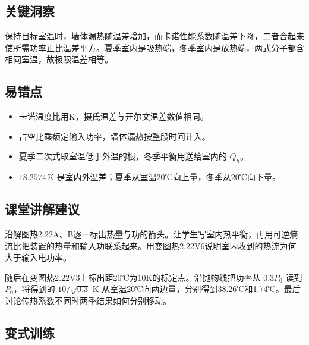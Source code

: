 \documentclass[UTF8,fontset=fandol,a4paper,11pt]{ctexart}
\begin{document}
\subsection*{关键洞察}

保持目标室温时，墙体漏热随温差增加，而卡诺性能系数随温差下降，二者合起来使所需功率正比温差平方。夏季室内是吸热端，冬季室内是放热端，两式分子都含相同室温，故极限温差相等。



\subsection*{易错点}

\begin{itemize}
\item 卡诺温度比用K，摄氏温差与开尔文温差数值相同。
\item 占空比乘额定输入功率，墙体漏热按整段时间计入。
\item 夏季二次式取室温低于外温的根，冬季平衡用送给室内的 $\dot Q_h$。
\item $18.2574\,\mathrm K$ 是室内外温差；夏季从室温20℃向上量，冬季从20℃向下量。
\end{itemize}



\subsection*{课堂讲解建议}

沿解图热2.22A、B逐一标出热量与功的箭头。让学生写室内热平衡，再用可逆熵流比把装置的热量和输入功联系起来。用变图热2.22V6说明室内收到的热流为何大于输入电功率。

随后在变图热2.22V3上标出距20℃为10K的标定点。沿抛物线把功率从 $0.3P_0$ 读到 $P_0$，将得到的 $10/\sqrt{0.3}$ K 从室温20℃向两边量，分别得到38.26℃和1.74℃。最后讨论传热系数不同时两季结果如何分别移动。



\subsection*{变式训练}
\end{document}
